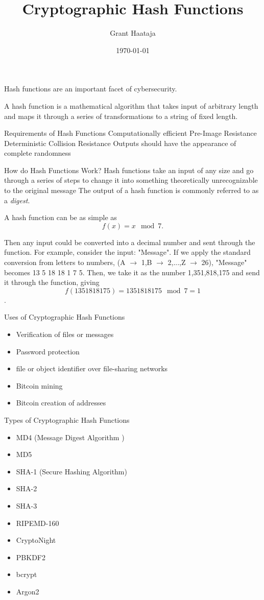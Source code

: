 \documentclass{article}
\title{Cryptographic Hash Functions}
\author{Grant Haataja}
\date{\today}
\begin{document}
	\maketitle	
	\tableofcontents
	
Hash functions are an important facet of cybersecurity.  



	A hash function is a mathematical algorithm that takes input of arbitrary length and maps it through a series of transformations to a string of fixed length.

{Requirements of Hash Functions}
		Computationally efficient
		Pre-Image Resistance 
		Deterministic  
		Collision Resistance
		Outputs should have the appearance of complete randomness

{How do Hash Functions Work?}
		Hash functions take an input of any size and go through a series of steps to change it into something theoretically unrecognizable to the original message
		The output of a hash function is commonly referred to as a \textit{digest}.
	
	A hash function can be as simple as $$f(x) = x\mod7.$$
		
	Then any input could be converted into a decimal number and sent through the function. For example, consider the input: "Message". If we apply the standard conversion from letters to numbers, (A $\rightarrow$ 1,B $\rightarrow$ 2,...,Z $\rightarrow$ 26), "Message" becomes 13 5 18 18 1 7 5. Then, we take it as the number 1,351,818,175 and send it through the function, giving $$f(1351818175) = 1351818175 \mod 7 = 1$$.

{Uses of Cryptographic Hash Functions}
	\begin{itemize}
		\item Verification of files or messages
		\item Password protection
		\item file or object identifier over file-sharing networks
		\item Bitcoin mining
		\item Bitcoin creation of addresses\newline
		
	\end{itemize}

{Types of Cryptographic Hash Functions}
	\begin{itemize}
		\item MD4 (Message Digest Algorithm )
		\item MD5 
		\item SHA-1 (Secure Hashing Algorithm)
		\item SHA-2
		\item SHA-3 
		\item RIPEMD-160 
		\item CryptoNight
		\item PBKDF2
		\item bcrypt
		\item Argon2\newline
	\end{itemize}
\end{document}
